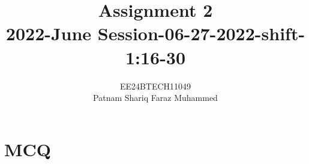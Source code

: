 \documentclass[journal]{IEEEtran}
\numberwithin{equation}{enumi}
\numberwithin{figure}{enumi}
\begin{document}


\title{Assignment 2 \\ 2022-June Session-06-27-2022-shift-1:16-30}
\author{EE24BTECH11049 \\ Patnam Shariq Faraz Muhammed}

{\let\newpage\relax\maketitle}
\section*{MCQ}
\end{document}
